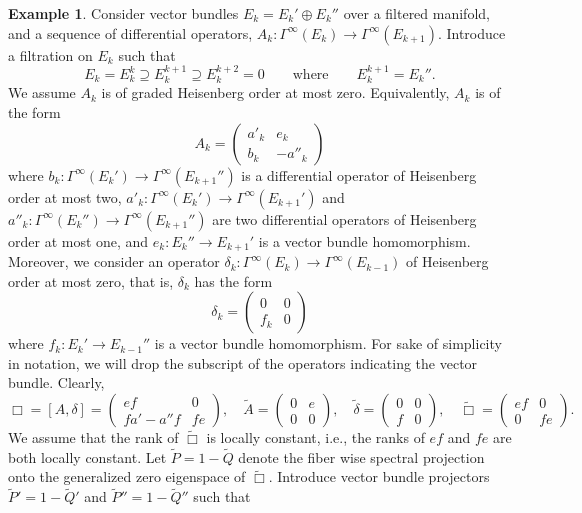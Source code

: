 \documentclass[reqno,12pt]{amsart}
\theoremstyle{plain}
\theoremstyle{definition}
\newtheorem{example}[theorem]{Example}
\begin{document}
\begin{example}\label{Ex:preRumin}
Consider vector bundles $E_k=E_k'\oplus E_k''$ over a filtered manifold, and a sequence of differential operators, $A_k\colon\Gamma^\infty(E_k)\to\Gamma^\infty(E_{k+1})$.
Introduce a filtration on $E_k$ such that 
$$
E_k=E_k^k\supseteq E_k^{k+1}\supseteq E_k^{k+2}=0
\qquad\text{where}\qquad
E_k^{k+1}=E_k''.
$$
We assume $A_k$ is of graded Heisenberg order at most zero.
Equivalently, $A_k$ is of the form
$$
A_k=\begin{pmatrix}a'_k&e_k\\b_k&-a''_k\end{pmatrix}
$$
where $b_k\colon\Gamma^\infty(E_k')\to\Gamma^\infty(E_{k+1}'')$ is a differential operator of Heisenberg order at most two, $a'_k\colon\Gamma^\infty(E_k')\to\Gamma^\infty(E_{k+1}')$ and $a''_k\colon\Gamma^\infty(E_k'')\to\Gamma^\infty(E_{k+1}'')$ are two differential operators of Heisenberg order at most one, and $e_k\colon E_k''\to E_{k+1}'$ is a vector bundle homomorphism.
Moreover, we consider an operator $\delta_k\colon\Gamma^\infty(E_k)\to\Gamma^\infty(E_{k-1})$ of Heisenberg order at most zero, that is, $\delta_k$ has the form
$$
\delta_k=\begin{pmatrix}0&0\\f_k&0\end{pmatrix}
$$
where $f_k\colon E_k'\to E_{k-1}''$ is a vector bundle homomorphism.
For sake of simplicity in notation, we will drop the subscript of the operators indicating the vector bundle.
Clearly,
$$
\Box=[A,\delta]=\begin{pmatrix}ef&0\\fa'-a''f&fe\end{pmatrix},
\quad
\tilde A=\begin{pmatrix}0&e\\0&0\end{pmatrix},
\quad
\tilde\delta=\begin{pmatrix}0&0\\f&0\end{pmatrix},
\quad
\tilde\Box=\begin{pmatrix}ef&0\\0&fe\end{pmatrix}.
$$
We assume that the rank of $\tilde\Box$ is locally constant, i.e., the ranks of $ef$ and $fe$ are both locally constant.
Let $\tilde P=1-\tilde Q$ denote the fiber wise spectral projection onto the generalized zero eigenspace of $\tilde\Box$.
Introduce vector bundle projectors $\tilde P'=1-\tilde Q'$ and $\tilde P''=1-\tilde Q''$ such that

\end{example}
\end{document}
